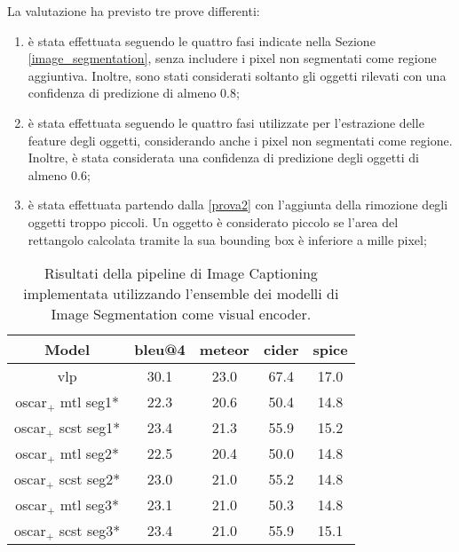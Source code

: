 La valutazione ha previsto tre prove differenti:
\begin{enumerate}[leftmargin=1.5cm, label=\textit{Prova \arabic*:}, ref=\textit{Prova \arabic*}]
    \item \label{prova1} è stata effettuata seguendo le quattro fasi indicate nella Sezione \ref{image_segmentation}, senza includere i pixel non segmentati come regione aggiuntiva. Inoltre, sono stati considerati soltanto gli oggetti rilevati con una confidenza di predizione di almeno 0.8;
    \item \label{prova2} è stata effettuata seguendo le quattro fasi utilizzate per l'estrazione delle feature degli oggetti, considerando anche i pixel non segmentati come regione.
    Inoltre, è stata considerata una confidenza di predizione degli oggetti di almeno 0.6;
    \item \label{prova3} è stata effettuata partendo dalla \ref{prova2} con l'aggiunta della rimozione degli oggetti troppo piccoli. Un oggetto è considerato piccolo se l'area del rettangolo calcolata tramite la sua bounding box è inferiore a mille pixel;
\end{enumerate}

\begin{table}[H]
\footnotesize
\begin{center}
\begin{tabular}{||c c c c c||} 
 \hline
 \textbf{Model} & \textbf{\acrshort{bleu}@4} & \textbf{\acrshort{meteor}} & \textbf{\acrshort{cider}} & \textbf{\acrshort{spice}}\\ [0.5ex] 
 \hline\hline
 \acrshort{vlp} \cite{zhou2020unified} & 30.1 & 23.0 & 67.4 & 17.0\\
 \hline
 \acrshort{oscar}$_+$ \acrshort{mtl} seg1* & 22.3 & 20.6 & 50.4 & 14.8\\
 \hline
 \acrshort{oscar}$_+$ \acrshort{scst} seg1* & 23.4 & 21.3 & 55.9 & 15.2\\
 \hline
 \acrshort{oscar}$_+$ \acrshort{mtl} seg2* & 22.5 & 20.4 & 50.0 & 14.8\\
 \hline
 \acrshort{oscar}$_+$ \acrshort{scst} seg2* & 23.0 & 21.0 & 55.2 & 14.8\\
 \hline
 \acrshort{oscar}$_+$ \acrshort{mtl} seg3* & 23.1 & 21.0 & 50.3 & 14.8\\
 \hline
 \acrshort{oscar}$_+$ \acrshort{scst} seg3* & 23.4 & 21.0 & 55.9 & 15.1\\
 \hline
\end{tabular}
\caption{Risultati della pipeline di Image Captioning implementata utilizzando l'ensemble dei modelli di Image Segmentation come visual encoder.}
\label{table:4}
\end{center}
\end{table}

